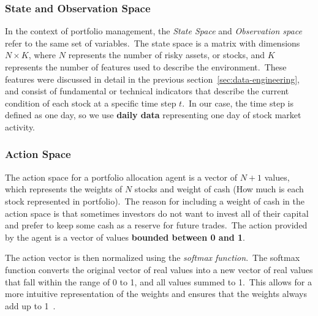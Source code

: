 \documentclass[../xlapes02]{subfiles}
\begin{document}

    \subsubsection{State and Observation Space}\label{subsubsec:state-space}
    In the context of portfolio management, the \emph{State Space} and \emph{Observation space} refer to the same set of variables.\ The state space is a matrix with dimensions $N\times K$, where $N$ represents the number of risky assets, or stocks, and $K$ represents the number of features used to describe the environment.\ These features were discussed in detail in the previous section~\cref{sec:data-engineering}, and consist of fundamental or technical indicators that describe the current condition of each stock at a specific time step $t$.\ In our case, the time step is defined as one day, so we use \textbf{daily data} representing one day of stock market activity.


    \subsubsection{Action Space}\label{subsubsec:action-space}
    The action space for a portfolio allocation agent is a vector of $N+1$ values, which represents the weights of $N$ stocks and weight of cash (How much is each stock represented in portfolio).\ The reason for including a weight of cash in the action space is that sometimes investors do not want to invest all of their capital and prefer to keep some cash as a reserve for future trades.\ The action provided by the agent is a vector of values \textbf{bounded between 0 and 1}.

    The action vector is then normalized using the \emph{softmax function}.\ The softmax function converts the original vector of real values into a new vector of real values that fall within the range of 0 to 1, and all values summed to 1.\ This allows for a more intuitive representation of the weights and ensures that the weights always add up to 1~\cite{finrl-portfolio-allocation-2020}.
\end{document}
